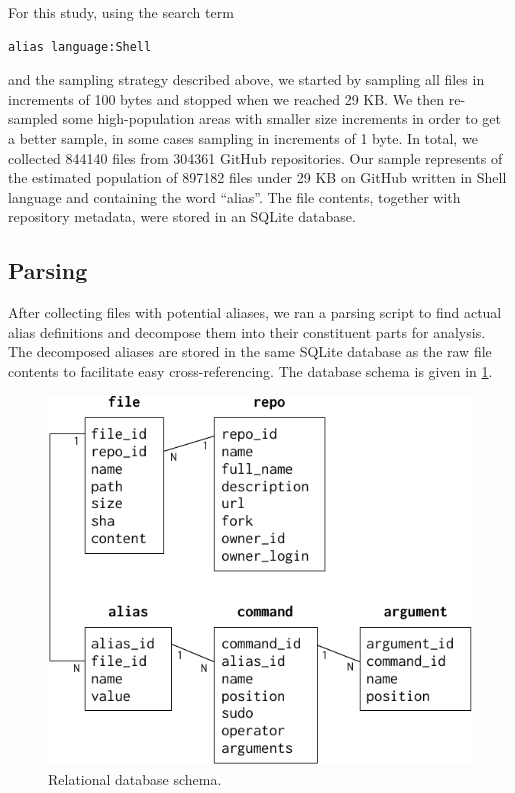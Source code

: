 For this study, using the search term
\begin{verbatim}
alias language:Shell
\end{verbatim}
and the sampling strategy described above, we started by sampling all files in increments of 100 bytes and stopped when we reached 29 KB.
We then re-sampled some high-population areas with smaller size increments in order to get a better sample, in some cases sampling in increments of 1 byte.
In total, we collected \num{844140} files from \num{304361} GitHub repositories.
Our sample represents  of the estimated population of \num{897182} files under 29 KB on GitHub written in Shell language and containing the word ``alias''.
The file contents, together with repository metadata, were stored in an SQLite database.

\subsection{Parsing}

After collecting files with potential aliases, we ran a parsing script to find actual alias definitions and decompose them into their constituent parts for analysis.
The decomposed aliases are stored in the same SQLite database as the raw file contents to facilitate easy cross-referencing.
The database schema is given in \cref{fig:schema}.

\begin{figure}
    \centering
    \includegraphics[width=0.9\columnwidth]{schema.pdf}
    \caption{Relational database schema.}
    \label{fig:schema}
\end{figure}

